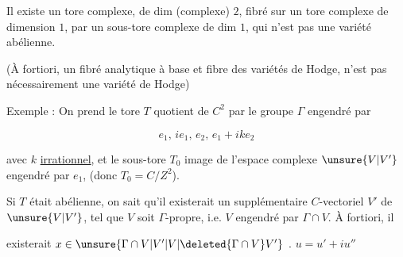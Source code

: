Il existe un tore complexe, de dim (complexe) $2$, fibré sur un tore complexe de dimension $1$,  par un sous-tore complexe de dim $1$, qui n'est pas une variété abélienne.

(À fortiori, un fibré analytique à base et fibre des variétés de Hodge, n'est pas nécessairement une variété de Hodge)

Exemple : On prend le tore $T$ quotient de $C^2$ par le groupe $\Gamma$ engendré par

\[ e_1,\,ie_1,\,e_2,\,e_1+ike_2 \]

avec $k$ \uline{irrationnel}, et le sous-tore $T_0$ image de l'espace complexe $\unsure{V|V'}$ engendré par $e_1$, (donc $T_0=C/Z^2$).

Si $T$ était abélienne, on sait qu'il existerait un supplémentaire $C$-vectoriel $V'$ de $\unsure{V|V'}$, tel que $V$ soit $\Gamma$-propre, i.e. $V$ engendré par $\Gamma\cap V$. À fortiori, il

existerait $x\in\unsure{\Gamma\cap V|V'|V|\deleted{\Gamma\cap V}V'}$  .  $u=u'+iu''$
